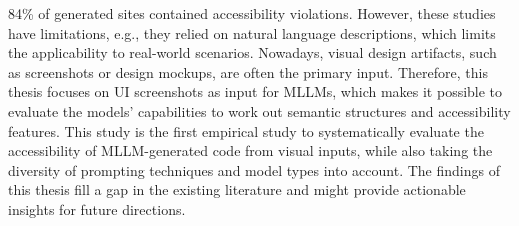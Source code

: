 84\% of generated sites contained accessibility violations.\newline 
However, these studies have limitations, e.g., they relied on 
natural language descriptions, which limits the 
applicability to real-world scenarios. Nowadays, visual 
design artifacts, such as screenshots or design mockups, are 
often the primary input. Therefore, this thesis 
focuses on UI screenshots as input for MLLMs, which makes it 
possible to evaluate the models' capabilities to work out 
semantic structures and accessibility features. This study 
is the first empirical study to systematically evaluate the 
accessibility of MLLM-generated code from visual inputs, while 
also taking the diversity of prompting techniques and model 
types into account. The findings of this thesis fill
a gap in the existing literature and might provide 
actionable insights for future directions.